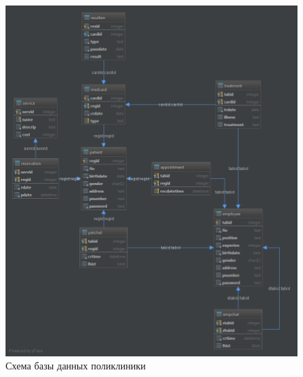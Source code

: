 \documentclass[14pt,a4paper,russian]{extreport}
\begin{document}
\begin{figure}[b!]
        \includegraphics[scale=0.6]{clinic}
        \caption{Схема базы данных поликлиники}
        \label{fig:clinic}
\end{figure}
\end{document}
